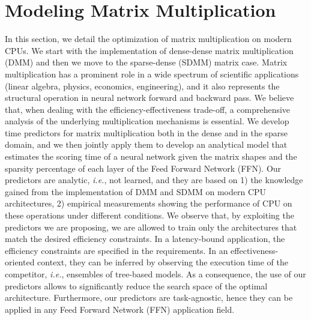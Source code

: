 
\section{Modeling Matrix Multiplication}
\label{sec:ModelMatMult}
In this section, we detail the optimization of matrix multiplication on modern CPUs. We start with the implementation of dense-dense matrix multiplication (DMM) and then we move to the sparse-dense (SDMM) matrix case. Matrix multiplication has a prominent role in a wide spectrum of scientific applications (linear algebra, physics, economics, engineering), and it also represents the structural operation in neural network forward and backward pass. We believe that, when dealing with the efficiency-effectiveness trade-off, a comprehensive analysis of the underlying multiplication mechanisms is essential. We develop time predictors for matrix multiplication both in the dense and in the sparse domain, and we then jointly apply them to develop an analytical model that estimates the scoring time of a neural network given the matrix shapes and the sparsity percentage of each layer of the Feed Forward Network (FFN). Our predictors are analytic, \textit{i.e.}, not learned, and they are based on 1) the knowledge gained from the implementation of DMM and SDMM on modern CPU architectures, 2) empirical measurements showing the performance of CPU on these operations under different conditions. 
 We observe that, by exploiting the predictors we are proposing, we are allowed to train only the architectures that match the desired efficiency constraints. In a latency-bound application, the efficiency constraints are specified in the requirements. In an effectiveness-oriented context, they can be inferred by observing the execution time of the competitor, \textit{i.e.}, ensembles of tree-based models. As a consequence, the use of our predictors allows to significantly reduce the search space of the optimal architecture. Furthermore, our predictors are task-agnostic, hence they can be applied in any Feed Forward Network (FFN) application field.


